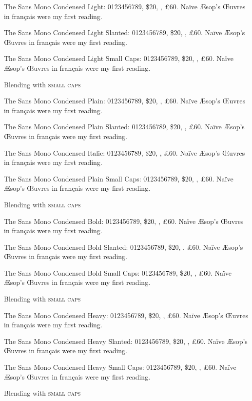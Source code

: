\documentclass{minimal}
\begin{document}
\ttfamily\raggedright

{\selectfont

The Sans Mono Condensed Light:  0123456789, \$20, , \pounds60.
Na\"ive \AE sop's \OE uvres in fran\c cais were my first reading.
\lipsum[10]

{\selectfont
The Sans Mono Condensed Light Slanted:  0123456789, \$20, ,
\pounds60. 
Na\"ive \AE sop's \OE uvres in fran\c cais were my first reading.
\lipsum[20]}

{\selectfont
The Sans Mono Condensed Light Small Caps:  0123456789, \$20,
, \pounds60. 
Na\"ive \AE sop's \OE uvres in fran\c cais were my first reading.
\lipsum[30]}

Blending with \textsc{small caps}}


The Sans Mono Condensed Plain:  0123456789, \$20, , \pounds60.
Na\"ive \AE sop's \OE uvres in fran\c cais were my first reading.
\lipsum[11]

{\selectfont
The Sans Mono Condensed Plain Slanted:  0123456789, \$20, ,
\pounds60. 
Na\"ive \AE sop's \OE uvres in fran\c cais were my first reading.
\lipsum[21]}

{\selectfont
The Sans Mono Condensed Italic:  0123456789, \$20, , \pounds60.
Na\"ive \AE sop's \OE uvres in fran\c cais were my first reading.
\lipsum[41]}


{\selectfont
The Sans Mono Condensed Plain Small Caps:  0123456789, \$20,
, \pounds60. 
Na\"ive \AE sop's \OE uvres in fran\c cais were my first reading.
\lipsum[31]}

Blending with \textsc{small caps}

{\selectfont

The Sans Mono Condensed Bold:  0123456789, \$20, , \pounds60.
Na\"ive \AE sop's \OE uvres in fran\c cais were my first reading.
\lipsum[12]

{\selectfont
The Sans Mono Condensed Bold Slanted:  0123456789, \$20, ,
\pounds60. 
Na\"ive \AE sop's \OE uvres in fran\c cais were my first reading.
\lipsum[22]}

{\selectfont
The Sans Mono Condensed Bold Small Caps:  0123456789, \$20,
, \pounds60. 
Na\"ive \AE sop's \OE uvres in fran\c cais were my first reading.
\lipsum[32]}

Blending with \textsc{small caps}}

{\selectfont

The Sans Mono Condensed Heavy:  0123456789, \$20, , \pounds60.
Na\"ive \AE sop's \OE uvres in fran\c cais were my first reading.
\lipsum[13]

{\selectfont
The Sans Mono Condensed Heavy Slanted:  0123456789, \$20, ,
\pounds60. 
Na\"ive \AE sop's \OE uvres in fran\c cais were my first reading.
\lipsum[23]}

{\selectfont
The Sans Mono Condensed Heavy Small Caps:  0123456789, \$20,
, \pounds60. 
Na\"ive \AE sop's \OE uvres in fran\c cais were my first reading.
\lipsum[33]}

Blending with \textsc{small caps}}
\end{document}
